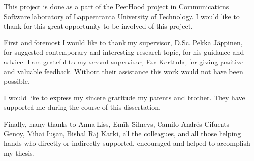 \Sentence
This project is done as a part of the PeerHood project in Communications Software laboratory of
Lappeenranta University of Technology.
\Sentence
I would like to thank for this great opportunity to be involved of this project.

\Sentence
First and foremost I would like to thank my supervisor, D.Sc. Pekka J\"appinen, for suggested
contemporary and interesting research topic, for his guidance and advice. 
\Sentence
I am grateful to my second supervisor, Esa Kerttula, for giving positive and valuable feedback. 
\Sentence
Without their assistance this work would not have been possible.

\Sentence
I would like to express my sincere gratitude my parents and brother.
\Sentence
They have supported me during the course of this dissertation.

\Sentence
Finally, many thanks to Anna Liss, Em\={i}ls \u{S}i\cb l\cb nevs, Camilo Andr\'{e}s
Cifuents Genoy, Mihai Iu\c{s}an, Bishal Raj Karki, all the colleagues, and all those helping hands
who directly or indirectly supported, encouraged and helped to accomplish my thesis.